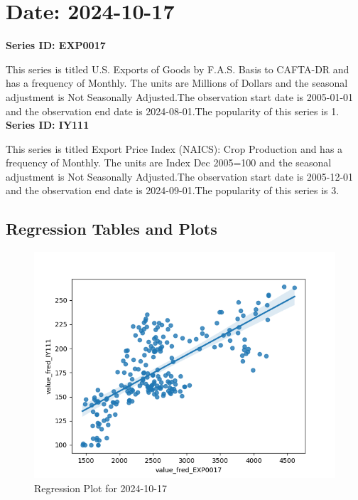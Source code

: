 \section{Date: 2024-10-17}
\noindent \textbf{Series ID: EXP0017} 

\noindent This series is titled U.S. Exports of Goods by F.A.S. Basis to CAFTA-DR and has a frequency of Monthly. The units are Millions of Dollars and the seasonal adjustment is Not Seasonally Adjusted.The observation start date is 2005-01-01 and the observation end date is 2024-08-01.The popularity of this series is 1. \\ 

\noindent \textbf{Series ID: IY111} 

\noindent This series is titled Export Price Index (NAICS): Crop Production and has a frequency of Monthly. The units are Index Dec 2005=100 and the seasonal adjustment is Not Seasonally Adjusted.The observation start date is 2005-12-01 and the observation end date is 2024-09-01.The popularity of this series is 3. \\ 

\subsection{Regression Tables and Plots}


\begin{figure}
\centering
\includegraphics[scale = 0.9]{plots/plot_2024-10-17.png}
\caption{Regression Plot for 2024-10-17}
\end{figure}
\newpage
